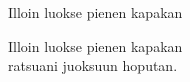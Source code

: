 \begin{song}{Illoin luokse pienen kapakan}
	
	Illoin luokse pienen kapakan\\
    ratsuani juoksuun hoputan.
	
\end{song}